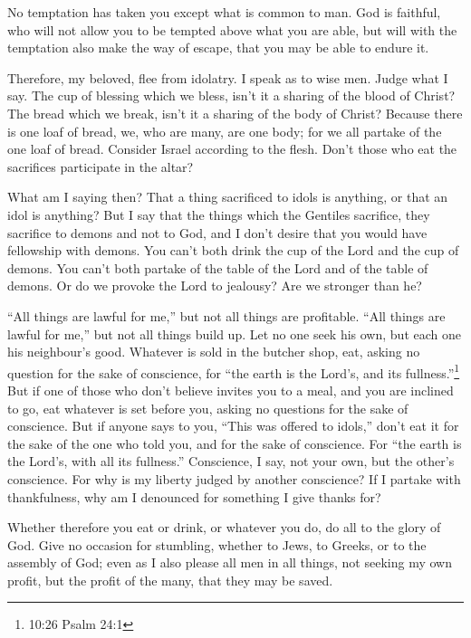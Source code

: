  No temptation has taken you except what is common to man.
God is faithful, who will not allow you to be tempted above what you are
able, but will with the temptation also make the way of escape, that you
may be able to endure it.

 Therefore, my beloved, flee from idolatry.  I
speak as to wise men. Judge what I say.  The cup of
blessing which we bless, isn't it a sharing of the blood of Christ? The
bread which we break, isn't it a sharing of the body of Christ?
 Because there is one loaf of bread, we, who are many, are
one body; for we all partake of the one loaf of bread. 
Consider Israel according to the flesh. Don't those who eat the
sacrifices participate in the altar?

 What am I saying then? That a thing sacrificed to idols is
anything, or that an idol is anything?  But I say that the
things which the Gentiles sacrifice, they sacrifice to demons and not to
God, and I don't desire that you would have fellowship with demons.
 You can't both drink the cup of the Lord and the cup of
demons. You can't both partake of the table of the Lord and of the table
of demons.  Or do we provoke the Lord to jealousy? Are we
stronger than he?

 ``All things are lawful for me,'' but not all things are
profitable. ``All things are lawful for me,'' but not all things build
up.  Let no one seek his own, but each one his neighbour's
good.  Whatever is sold in the butcher shop, eat, asking no
question for the sake of conscience,  for ``the earth is
the Lord's, and its fullness.''\footnote{10:26 Psalm 24:1} 
But if one of those who don't believe invites you to a meal, and you are
inclined to go, eat whatever is set before you, asking no questions for
the sake of conscience.  But if anyone says to you, ``This
was offered to idols,'' don't eat it for the sake of the one who told
you, and for the sake of conscience. For ``the earth is the Lord's, with
all its fullness.''  Conscience, I say, not your own, but
the other's conscience. For why is my liberty judged by another
conscience?  If I partake with thankfulness, why am I
denounced for something I give thanks for?

 Whether therefore you eat or drink, or whatever you do, do
all to the glory of God.  Give no occasion for stumbling,
whether to Jews, to Greeks, or to the assembly of God; 
even as I also please all men in all things, not seeking my own profit,
but the profit of the many, that they may be saved.

